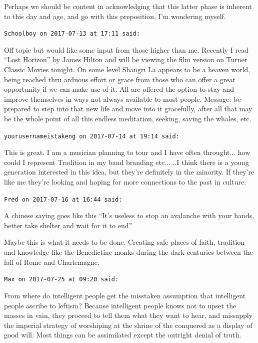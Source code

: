 \begin{footnotesize}
\begin{sffamily}
Perhaps we should be content in acknowledging that this latter phase is inherent to this day and age, and go with this preposition. I'm wondering myself.

\hfill

\texttt{Schoolboy on 2017-07-13 at 17:11 said:}

Off topic but would like some input from those higher than me. Recently I read ``Lost Horizon'' by James Hilton and will be viewing the film version on Turner Classic Movies tonight. On some level Shangri La appears to be a heaven world, being reached thru arduous effort or grace from those who can offer a great opportunity if we can make use of it. All are offered the option to stay and improve themselves in ways not always available to most people. Message: be prepared to step into that new life and move into it gracefully, after all that may be the whole point of all this endless meditation, seeking, saving the whales, etc.

\hfill

\texttt{yourusernameistakeng on 2017-07-14 at 19:14 said:}

This is great. I am a musician planning to tour and I have often throught... how could I represent Tradition in my band branding etc... ..I think there is a young generation interested in this idea, but they're definitely in the minority. If they're like me they're looking and hoping for more connections to the past in culture.

\hfill

\texttt{Fred on 2017-07-16 at 16:44 said:}

A chinese saying goes like this ``It's useless to stop an avalanche with your hands, better take shelter and wait for it to end''

Maybe this is what it needs to be done. Creating safe places of faith, tradition and knowledge like the Benedictine monks during the dark centuries between the fall of Rome and Charlemagne.

\hfill

\texttt{Max on 2017-07-25 at 09:20 said:}

From where do intelligent people get the misstaken assumption that intelligent people ascribe to leftism? Because intelligent people knows not to upset the masses in vain, they proceed to tell them what they want to hear, and missapply the imperial strategy of worshiping at the shrine of the conquered as a display of good will. Most things can be assimilated except the outright denial of truth.


\end{sffamily}
\end{footnotesize}
